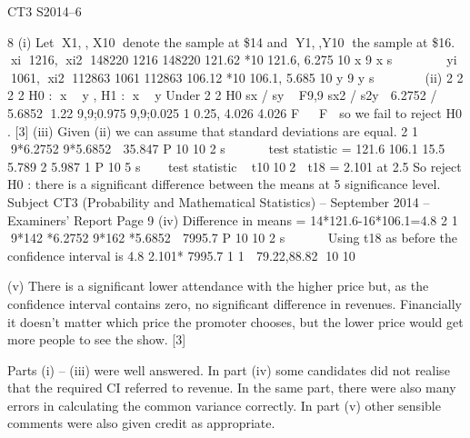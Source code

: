 \documentclass[a4paper,12pt]{article}
\begin{document}

CT3 S2014–6

\newpage


8 (i) Let X1,, X10 denote the sample at \$14 and Y1,,Y10 the sample at \$16.
xi 1216, xi2 148220
1216 148220 121.62 *10 121.6, 6.275
10 x 9 x s 
    
yi 1061, xi2 112863
1061 112863 106.12 *10 106.1, 5.685
10 y 9 y s 
     
(ii) 2 2 2 2
H0 : x  y , H1 : x  y
Under 2 2
H0 sx / sy ~ F9,9
sx2 / s2y  6.2752 / 5.6852 1.22
9,9;0.975 9,9;0.025
1 0.25, 4.026
4.026
F   F  so we fail to reject H0 . [3]
(iii) Given (ii) we can assume that standard deviations are equal.
2 1 9*6.2752 9*5.6852  35.847
P 10 10 2 s   
 
test statistic = 121.6 106.1 15.5 5.789
2 5.987 1
P 10 5 s

 
test statistic ~ t10102  t18 = 2.101 at 2.5%
So reject H0 : there is a significant difference between the means at 5%
significance level. 
Subject CT3 (Probability and Mathematical Statistics) – September 2014 – Examiners’ Report
Page 9
(iv) Difference in means = 14*121.6-16*106.1=4.8
2 1 9*142 *6.2752 9*162 *5.6852  7995.7
P 10 10 2 s   
 
Using t18 as before the confidence interval is
4.8 2.101* 7995.7 1 1  79.22,88.82
10 10
       
 

(v) There is a significant lower attendance with the higher price but, as the
confidence interval contains zero, no significant difference in revenues.
Financially it doesn’t matter which price the promoter chooses, but the lower
price would get more people to see the show. [3]

Parts (i) – (iii) were well answered. In part (iv) some candidates did not realise that the
required CI referred to revenue. In the same part, there were also many errors in calculating
the common variance correctly. In part (v) other sensible comments were also given credit
as appropriate.
\end{document}
